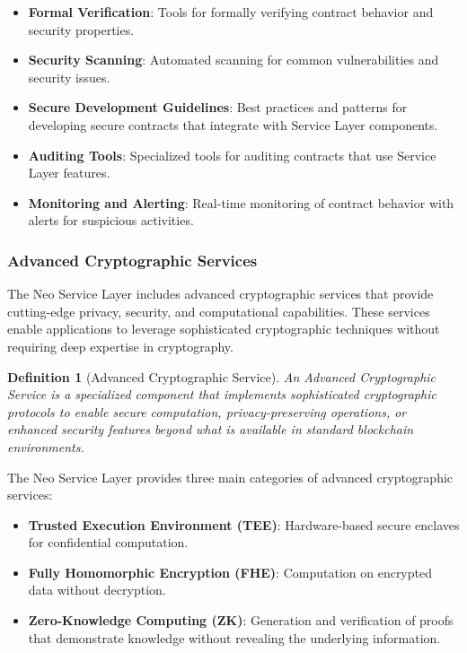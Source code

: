 \documentclass{article}
\newtheorem{definition}{Definition}
\begin{document}
\begin{itemize}
    \item \textbf{Formal Verification}: Tools for formally verifying contract behavior and security properties.
    
    \item \textbf{Security Scanning}: Automated scanning for common vulnerabilities and security issues.
    
    \item \textbf{Secure Development Guidelines}: Best practices and patterns for developing secure contracts that integrate with Service Layer components.
    
    \item \textbf{Auditing Tools}: Specialized tools for auditing contracts that use Service Layer features.
    
    \item \textbf{Monitoring and Alerting}: Real-time monitoring of contract behavior with alerts for suspicious activities.
\end{itemize}

\subsubsection{Advanced Cryptographic Services}
\label{subsubsec:advanced-crypto}

The Neo Service Layer includes advanced cryptographic services that provide cutting-edge privacy, security, and computational capabilities. These services enable applications to leverage sophisticated cryptographic techniques without requiring deep expertise in cryptography.



\begin{definition}[Advanced Cryptographic Service]
An Advanced Cryptographic Service is a specialized component that implements sophisticated cryptographic protocols to enable secure computation, privacy-preserving operations, or enhanced security features beyond what is available in standard blockchain environments.
\end{definition}

The Neo Service Layer provides three main categories of advanced cryptographic services:

\begin{itemize}
    \item \textbf{Trusted Execution Environment (TEE)}: Hardware-based secure enclaves for confidential computation.
    
    \item \textbf{Fully Homomorphic Encryption (FHE)}: Computation on encrypted data without decryption.
    
    \item \textbf{Zero-Knowledge Computing (ZK)}: Generation and verification of proofs that demonstrate knowledge without revealing the underlying information.
\end{itemize}
\end{document}
